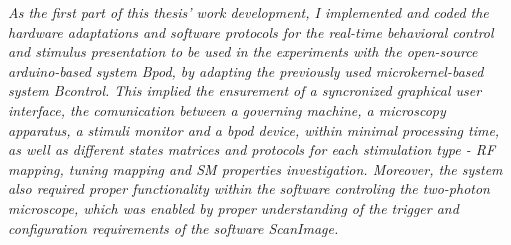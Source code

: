 
\label{cap:chapter}

\textit{As the first part of this thesis' work development, I implemented and coded the hardware adaptations and software protocols for the real-time behavioral control and stimulus presentation to be used in the experiments with the open-source arduino-based system Bpod, by adapting the previously used microkernel-based system Bcontrol. This implied the ensurement of a syncronized graphical user interface, the comunication between a governing machine, a microscopy apparatus, a stimuli monitor and a bpod device, within minimal processing time, as well as different states matrices and protocols for each stimulation type - RF mapping, tuning mapping and SM properties investigation.
Moreover, the system also required proper functionality within the software controling the two-photon microscope, which was enabled by proper understanding of the trigger and configuration requirements of the software ScanImage.}



%



\cleardoublepage
